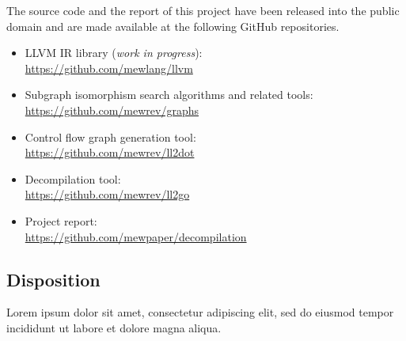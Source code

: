 \documentclass[12pt, a4paper]{article}
\begin{document}
The source code and the report of this project have been released into the public domain \cite{cc0} and are made available at the following GitHub repositories.
\begin{itemize}
	\item LLVM IR library (\textit{work in progress}): \\ \url{https://github.com/mewlang/llvm}
	\item Subgraph isomorphism search algorithms and related tools: \\ \url{https://github.com/mewrev/graphs}
	\item Control flow graph generation tool: \\ \url{https://github.com/mewrev/ll2dot}
	\item Decompilation tool: \\ \url{https://github.com/mewrev/ll2go}
	\item Project report: \\ \url{https://github.com/mewpaper/decompilation}
\end{itemize}

%
%


\subsection{Disposition}

Lorem ipsum dolor sit amet, consectetur adipiscing elit, sed do eiusmod tempor incididunt ut labore et dolore magna aliqua.

\pagebreak


\end{document}
